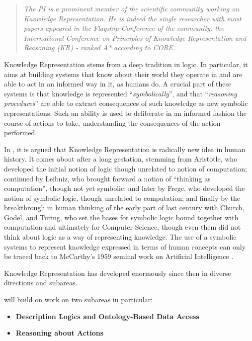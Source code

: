 \begin{quote}\it
The PI is  a prominent member of the scientific community working on Knowledge Representation. He is indeed the single researcher with most papers appeared in the Flagship Conference of the community: the International Conference on Principles of Knowledge Representation and Reasoning (KR) - ranked A* according to CORE.
\end{quote}


Knowledge Representation stems from a deep
tradition in logic. In particular, it aims at building systems that
know about their world they operate in and are able to act in an informed way in it,
as humans do.
A crucial part of these systems is that knowledge is represented
``\emph{symbolically}'', and that ``\emph{reasoning procedures}'' are able to extract
consequences of such knowledge as new symbolic representations. Such
an ability is used to deliberate in an informed fashion the course of
actions to take, understanding the consequences of the action performed.

In \cite{Leve14,Leve17}, it is argued that Knowledge Representation is
radically new idea in human history. It comes about after a long
gestation, stemming from Aristotle, who developed the initial notion
of logic though unrelated to notion of computation; continued by
Leibniz, who brought forward a notion of ``thinking as computation'',
though not yet symbolic; and later by Frege, who developed the notion
of symbolic logic, though unrelated to computation; and finally by the
breakthrough in human thinking of the early part of last century with
Church, Godel, and Turing, who set the bases for symbolic logic bound
together with computation and ultimately for Computer Science, though
even them did not think about logic as a way of representing
knowledge. The use of a symbolic systems to represent knowledge
expressed in terms of human concepts can only be traced back to
McCarthy's 1959 seminal work on Artificial Intelligence \cite{McCa57}.

Knowledge Representation has developed enormously since then in
diverse directions and subareas. 

\project will build on work on two subareas in particular:
\begin{itemize}
\item \textbf{Description Logics and Ontology-Based Data Access}
\item \textbf{Reasoning about Actions}
\end{itemize}

